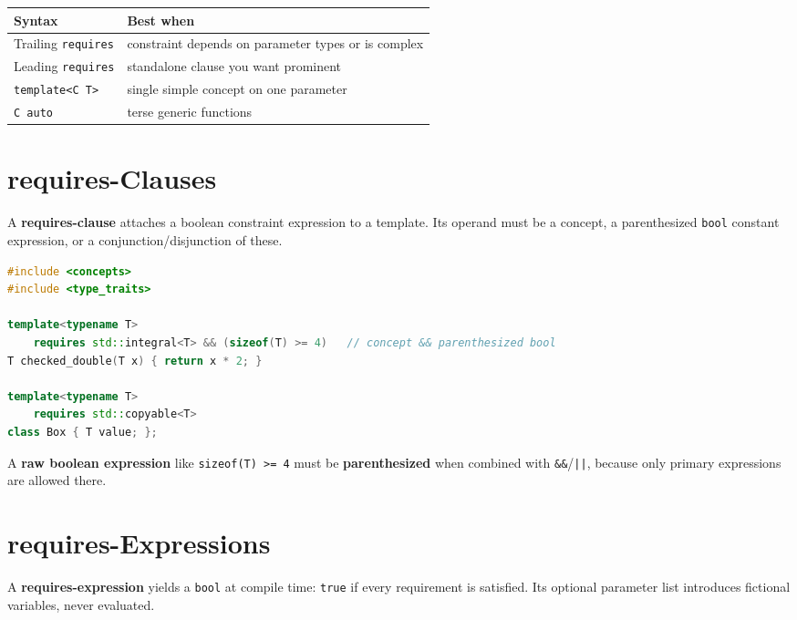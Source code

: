 \begin{center}
\begin{tabular}{ll}
\hline
\textbf{Syntax} & \textbf{Best when} \\
\hline
Trailing \texttt{requires} & constraint depends on parameter types or is complex \\
Leading \texttt{requires} & standalone clause you want prominent \\
\texttt{template<C T>} & single simple concept on one parameter \\
\texttt{C auto} & terse generic functions \\
\hline
\end{tabular}
\end{center}

\section{requires-Clauses}
\label{sec:c20-requires-clause}

A \textbf{requires-clause} attaches a boolean constraint expression to a template. Its operand must be a concept, a parenthesized \texttt{bool} constant expression, or a conjunction/disjunction of these.

\begin{lstlisting}[language=C++,caption={requires-clauses with composed and parenthesized constraints}]
#include <concepts>
#include <type_traits>

template<typename T>
    requires std::integral<T> && (sizeof(T) >= 4)   // concept && parenthesized bool
T checked_double(T x) { return x * 2; }

template<typename T>
    requires std::copyable<T>
class Box { T value; };
\end{lstlisting}

A \textbf{raw boolean expression} like \texttt{sizeof(T) >= 4} must be \textbf{parenthesized} when combined with \texttt{\&\&}/\texttt{||}, because only primary expressions are allowed there.

\section{requires-Expressions}
\label{sec:c20-requires-expression}

A \textbf{requires-expression} yields a \texttt{bool} at compile time: \texttt{true} if every requirement is satisfied. Its optional parameter list introduces fictional variables, never evaluated.

